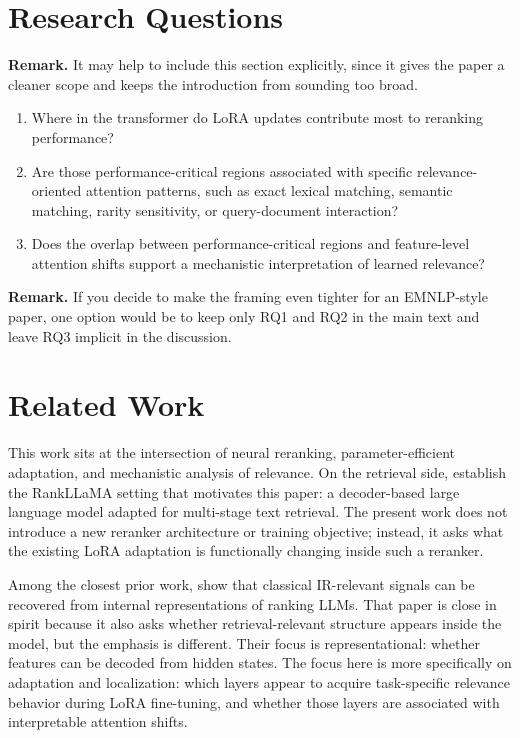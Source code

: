 \documentclass[10pt]{article}
\newcommand{\remark}[1]{{\color{blue}\textbf{Remark.} #1}}
\begin{document}
\section{Research Questions}

\remark{It may help to include this section explicitly, since it gives the paper a cleaner scope and keeps the introduction from sounding too broad.}

\begin{enumerate}[label=\textbf{RQ\arabic*.}, leftmargin=*, itemsep=4pt]
  \item Where in the transformer do LoRA updates contribute most to reranking performance?
  \item Are those performance-critical regions associated with specific relevance-oriented attention patterns, such as exact lexical matching, semantic matching, rarity sensitivity, or query-document interaction?
  \item Does the overlap between performance-critical regions and feature-level attention shifts support a mechanistic interpretation of learned relevance?
\end{enumerate}

\remark{If you decide to make the framing even tighter for an EMNLP-style paper, one option would be to keep only RQ1 and RQ2 in the main text and leave RQ3 implicit in the discussion.}

\section{Related Work}

This work sits at the intersection of neural reranking, parameter-efficient adaptation, and mechanistic analysis of relevance.
On the retrieval side, \citet{ma2024rankllama} establish the RankLLaMA setting that motivates this paper: a decoder-based large language model adapted for multi-stage text retrieval.
The present work does not introduce a new reranker architecture or training objective; instead, it asks what the existing LoRA adaptation is functionally changing inside such a reranker.

Among the closest prior work, \citet{nijasure2025probing} show that classical IR-relevant signals can be recovered from internal representations of ranking LLMs.
That paper is close in spirit because it also asks whether retrieval-relevant structure appears inside the model, but the emphasis is different.
Their focus is representational: whether features can be decoded from hidden states.
The focus here is more specifically on adaptation and localization: which layers appear to acquire task-specific relevance behavior during LoRA fine-tuning, and whether those layers are associated with interpretable attention shifts.
\end{document}
